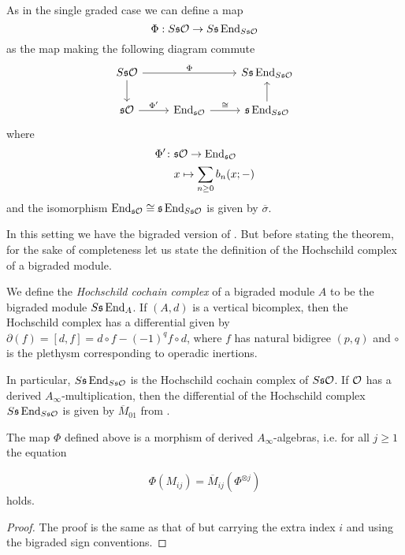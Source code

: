 \documentclass[join.tex]{subfiles}
\begin{document}
As in the single graded case we can define a map
\[\Phi:S\mathfrak{s}{\mathcal O}\to S\mathfrak{s}\operatorname{End}_{S\mathfrak{s}{\mathcal O}}\]
as the map making the following diagram commute
\[
\begin{tikzcd}
S\s\OO\arrow[rr, "\Phi"]\arrow[d] & & S\s\End_{S\s\OO}\\
\s\OO\arrow[r, "\Phi'"]& \End_{\s\OO}\arrow[r, "\cong"]& \s\End_{S\s\OO}\arrow[u]
\end{tikzcd}
\]
where 
\begin{align*}
\Phi'\colon&\mathfrak{s}{\mathcal O} \to \operatorname{End}_{\mathfrak{s}{\mathcal O}}\\
&x\mapsto \sum_{n\geq 0}b_n(x;-)
\end{align*}
and the isomorphism $\operatorname{End}_{\mathfrak{s}{\mathcal O}}\cong\mathfrak{s}\operatorname{End}_{S\mathfrak{s}{\mathcal O}}$ is given by $\overline{\sigma}$.

In this setting we have the bigraded version of . But before stating the theorem, for the sake of completeness let us state the definition of the Hochschild complex of a bigraded module.
\begin{defin}
We define the \emph{Hochschild cochain complex} of a bigraded module $A$ to be the bigraded module $S\mathfrak{s}\operatorname{End}_A$. If $(A,d)$ is a vertical bicomplex, then the Hochschild complex has a differential given by $\partial(f)=[d,f]=d\circ f-(-1)^{q}f\circ d$, where $f$ has natural bidigree $(p,q)$ and $\circ$ is the plethysm corresponding to operadic inertions.
\end{defin}
In particular, $S\mathfrak{s}\operatorname{End}_{S\mathfrak{s}{\mathcal O}}$ is the Hochschild cochain complex of $S\mathfrak{s}{\mathcal O}$. If ${\mathcal O}$ has a derived $A_\infty$-multiplication, then the differential of the Hochschild complex $S\mathfrak{s}\operatorname{End}_{S\mathfrak{s}{\mathcal O}}$ is given by $\overline{M}_{01}$ from .
\begin{thm}\label{bigradedtheorem}
The map $\Phi$ defined above is a morphism of derived $A_\infty$-algebras, i.e. for all $j\geq 1$ the equation

\[\Phi(M_{ij})=\overline{M}_{ij}(\Phi^{\otimes j})\]
holds.%
\end{thm}
\begin{proof}
The proof is the same as that of  but carrying the extra index $i$ and using the bigraded sign conventions.
\end{proof}
\end{document}
